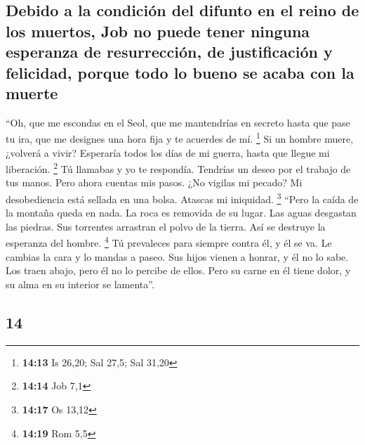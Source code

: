 \begin{paracol}{2}
\hypertarget{debido-a-la-condiciuxf3n-del-difunto-en-el-reino-de-los-muertos-job-no-puede-tener-ninguna-esperanza-de-resurrecciuxf3n-de-justificaciuxf3n-y-felicidad-porque-todo-lo-bueno-se-acaba-con-la-muerte}{%
\subsection{Debido a la condición del difunto en el reino de los
muertos, Job no puede tener ninguna esperanza de resurrección, de
justificación y felicidad, porque todo lo bueno se acaba con la
muerte}\label{debido-a-la-condiciuxf3n-del-difunto-en-el-reino-de-los-muertos-job-no-puede-tener-ninguna-esperanza-de-resurrecciuxf3n-de-justificaciuxf3n-y-felicidad-porque-todo-lo-bueno-se-acaba-con-la-muerte}}

 ``Oh, que me escondas en el Seol, que me mantendrías en
secreto hasta que pase tu ira, que me designes una hora fija y te
acuerdes de mí. \footnote{\textbf{14:13} Is 26,20; Sal 27,5; Sal 31,20}
 Si un hombre muere, ¿volverá a vivir? Esperaría todos
los días de mi guerra, hasta que llegue mi liberación. \footnote{\textbf{14:14}
  Job 7,1}  Tú llamabas y yo te respondía. Tendrías un
deseo por el trabajo de tus manos.  Pero ahora cuentas
mis pasos. ¿No vigilas mi pecado?  Mi desobediencia está
sellada en una bolsa. Atascas mi iniquidad. \footnote{\textbf{14:17} Os
  13,12}  ``Pero la caída de la montaña queda en nada. La
roca es removida de su lugar.  Las aguas desgastan las
piedras. Sus torrentes arrastran el polvo de la tierra. Así se destruye
la esperanza del hombre. \footnote{\textbf{14:19} Rom 5,5}
 Tú prevaleces para siempre contra él, y él se va. Le
cambias la cara y lo mandas a paseo.  Sus hijos vienen a
honrar, y él no lo sabe. Los traen abajo, pero él no lo percibe de
ellos.  Pero su carne en él tiene dolor, y su alma en su
interior se lamenta''.

\switchcolumn
\begin{otherlanguage}{english}

\hypertarget{section-27}{%
\section{14}\label{section-27}}


\end{otherlanguage}
\end{paracol}

